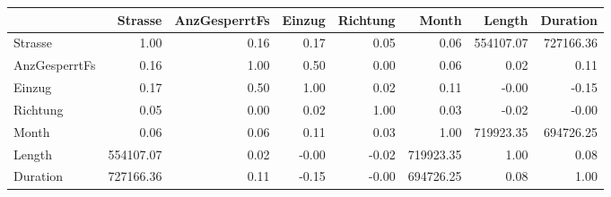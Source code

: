 \begin{tabular}{lrrrrrrr}
\toprule
{} &   Strasse &  AnzGesperrtFs &  Einzug &  Richtung &     Month &    Length &  Duration \\
\midrule
Strasse       &      1.00 &           0.16 &    0.17 &      0.05 &      0.06 & 554107.07 & 727166.36 \\
AnzGesperrtFs &      0.16 &           1.00 &    0.50 &      0.00 &      0.06 &      0.02 &      0.11 \\
Einzug        &      0.17 &           0.50 &    1.00 &      0.02 &      0.11 &     -0.00 &     -0.15 \\
Richtung      &      0.05 &           0.00 &    0.02 &      1.00 &      0.03 &     -0.02 &     -0.00 \\
Month         &      0.06 &           0.06 &    0.11 &      0.03 &      1.00 & 719923.35 & 694726.25 \\
Length        & 554107.07 &           0.02 &   -0.00 &     -0.02 & 719923.35 &      1.00 &      0.08 \\
Duration      & 727166.36 &           0.11 &   -0.15 &     -0.00 & 694726.25 &      0.08 &      1.00 \\
\bottomrule
\end{tabular}
